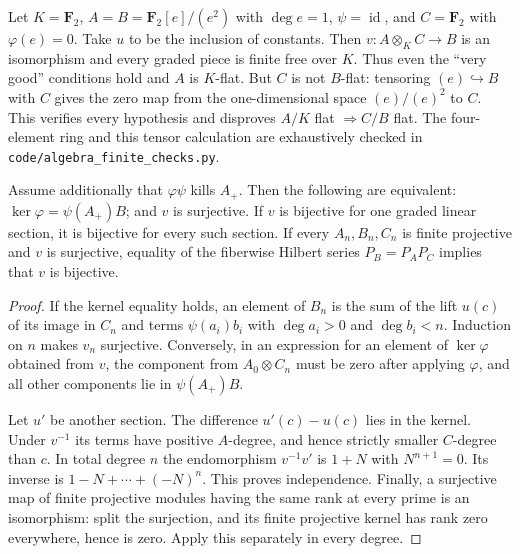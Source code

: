 \begin{example}\label{SA23-G-2}
Let $K=\mathbf F_2$, $A=B=\mathbf F_2[e]/(e^2)$ with $\deg e=1$,
$\psi=\operatorname{id}$, and $C=\mathbf F_2$ with
$\varphi(e)=0$.  Take $u$ to be the inclusion of constants.  Then
$v:A\otimes_K C\to B$ is an isomorphism and every graded piece is
finite free over $K$.  Thus even the ``very good'' conditions hold and
$A$ is $K$-flat.  But $C$ is not $B$-flat: tensoring
$(e)\hookrightarrow B$ with $C$ gives the zero map from the
one-dimensional space $(e)/(e)^2$ to $C$.  This verifies every hypothesis
and disproves $A/K$ flat $\Rightarrow C/B$ flat.  The four-element ring
and this tensor calculation are exhaustively checked in
\texttt{code/algebra\_finite\_checks.py}.
\end{example}

\begin{proposition}\label{SA23-G-3}
Assume additionally that $\varphi\psi$ kills $A_+$.  Then the following
are equivalent: $\ker\varphi=\psi(A_+)B$; and $v$ is surjective.
If $v$ is bijective for one graded linear section, it is bijective for
every such section.  If every $A_n,B_n,C_n$ is finite projective and
$v$ is surjective, equality of the fiberwise Hilbert series
$P_B=P_A P_C$ implies that $v$ is bijective.
\end{proposition}
\begin{proof}
If the kernel equality holds, an element of $B_n$ is the sum of the
lift $u(c)$ of its image in $C_n$ and terms $\psi(a_i)b_i$ with
$\deg a_i>0$ and $\deg b_i<n$.  Induction on $n$ makes $v_n$
surjective.  Conversely, in an expression for an element of
$\ker\varphi$ obtained from $v$, the component from $A_0\otimes C_n$
must be zero after applying $\varphi$, and all other components lie in
$\psi(A_+)B$.

Let $u'$ be another section.  The difference $u'(c)-u(c)$ lies in the
kernel.  Under $v^{-1}$ its terms have positive $A$-degree, and hence
strictly smaller $C$-degree than $c$.  In total degree $n$ the
endomorphism $v^{-1}v'$ is $1+N$ with $N^{n+1}=0$.
Its inverse is $1-N+\cdots+(-N)^n$.  This proves independence.
Finally, a surjective map of finite projective modules having the same
rank at every prime is an isomorphism: split the surjection, and its
finite projective kernel has rank zero everywhere, hence is zero.
Apply this separately in every degree.
\end{proof}

